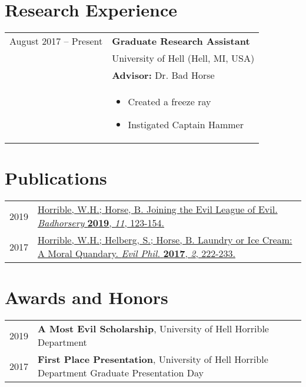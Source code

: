 \documentclass[legalpaper,11pt]{article}
\newenvironment{CVSpan}
{
    \begin{tabular}{S|T}
}
{
     \end{tabular}\vspace{0.5\baselineskip}
}
\newenvironment{CVYear}
{
    \begin{tabular}{Y|Z}
}
{
     \end{tabular}\vspace{0.5\baselineskip}
}
\newcommand{\CVInfo}[2]{
    #1 & #2\\
}
\newcommand{\CVItems}[1]{
    &
    \begin{itemize}
    #1
    \end{itemize}\\
}
\begin{document}

\section{Research Experience}

\begin{CVSpan}
    \CVInfo{August 2017 -- Present}{\textbf{Graduate Research Assistant}}
    \CVInfo{}{University of Hell (Hell, MI, USA)}
    \CVInfo{}{\textbf{Advisor:} Dr. Bad Horse}
    \CVItems{
            \item Created a freeze ray
            \item Instigated Captain Hammer
    }
\end{CVSpan}



\section{Publications}

\begin{CVYear}
    \CVInfo{2019}{\href{https://doi.org/}{Horrible, W.H.; Horse, B. Joining the Evil League of Evil. \textit{Badhorsery} \textbf{2019}, \textit{11}, 123-154.}}
    
    \CVInfo{2017}{\href{https://doi.org/}{Horrible, W.H.; Helberg, S.; Horse, B. Laundry or Ice Cream: A Moral Quandary. \textit{Evil Phil.} \textbf{2017}, \textit{2}, 222-233.}}
\end{CVYear}


\section{Awards and Honors}

\begin{CVYear}
    \CVInfo{2019}{\textbf{A Most Evil Scholarship}, University of Hell Horrible Department}

    \CVInfo{2017}{\textbf{First Place Presentation}, University of Hell Horrible Department Graduate Presentation Day}
\end{CVYear}
\end{document}
